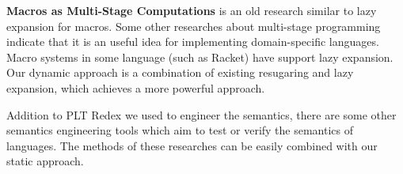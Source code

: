 {\bfseries Macros as Multi-Stage Computations\cite{multistage}} is an old research similar to lazy expansion for macros. Some other researches\cite{modularstaging} about multi-stage programming\cite{MSP} indicate that it is an useful idea for implementing domain-specific languages. Macro systems in some language (such as Racket\cite{racket}) have support lazy expansion. Our dynamic approach is a combination of existing resugaring and lazy expansion, which achieves a more powerful approach.
\cite{Ziggurat,origintracking}

Addition to PLT Redex\cite{SEwPR} we used to engineer the semantics, there are some other semantics engineering tools\cite{dynsem,Ksemantic} which aim to test or verify the semantics of languages. The methods of these researches can be easily combined with our static approach.




